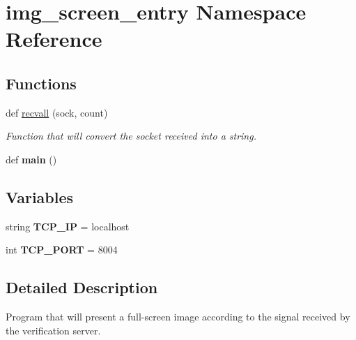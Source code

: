 \hypertarget{namespaceimg__screen__entry}{}\section{img\+\_\+screen\+\_\+entry Namespace Reference}
\label{namespaceimg__screen__entry}
\subsection*{Functions}
\begin{DoxyCompactItemize}
\item 
def \hyperlink{namespaceimg__screen__entry_a3f7a15b53e16575e4202196a8acc6281}{recvall} (sock, count)
\begin{DoxyCompactList}\small\item\em Function that will convert the socket received into a string. \end{DoxyCompactList}\item 
def {\bfseries main} ()\hypertarget{namespaceimg__screen__entry_a1095a257ffc3f63f8b6384fb24227302}{}\label{namespaceimg__screen__entry_a1095a257ffc3f63f8b6384fb24227302}

\end{DoxyCompactItemize}
\subsection*{Variables}
\begin{DoxyCompactItemize}
\item 
string {\bfseries T\+C\+P\+\_\+\+IP} = \textquotesingle{}localhost\textquotesingle{}\hypertarget{namespaceimg__screen__entry_afe06b4e41a1facc65c4045482aaa4381}{}\label{namespaceimg__screen__entry_afe06b4e41a1facc65c4045482aaa4381}

\item 
int {\bfseries T\+C\+P\+\_\+\+P\+O\+RT} = 8004\hypertarget{namespaceimg__screen__entry_acbc1d6aba5755d61c20444435e1b2934}{}\label{namespaceimg__screen__entry_acbc1d6aba5755d61c20444435e1b2934}

\end{DoxyCompactItemize}


\subsection{Detailed Description}
\begin{DoxyVerb}Program that will present a full-screen image according to the signal received by the verification server.
\end{DoxyVerb}
 

